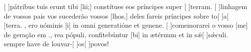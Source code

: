 {  {[ ]{pá}tribus tuis erunt tibi [lii;] constítues eos príncipes super [ ]{ter}ram.}%
    {[ ]{li}nhagem de vossos pais vos sucederão vossos [\-lhos,] deles fareis príncipes sobre to[ ]{a}[ ]{ter}ra. },
  { ero nóminis [i] in omni generatióne et genene.}%
    {[ ]{co}memorarei o vosso [me] de geração em .},
  {rea pópuli, confitebúntur [bi] in ætérnum et in sǽ[ ]{sǽ}culi.}%
    { sempre have de louvar-[ ]{os}[ ]{po}vos!}
}